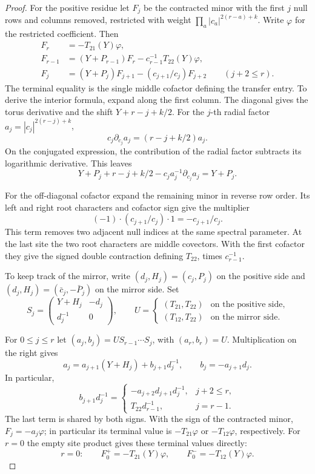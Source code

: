 \begin{proof}
For the positive residue let \(F_j\) be the contracted
minor with the first \(j\) null rows and columns removed,
restricted with weight \(\prod_a|c_a|^{2(r-a)+k}\).
Write \(\varphi\) for the restricted coefficient.
Then
\begin{align*}
 F_r&=-T_{21}(Y)\varphi,\\
 F_{r-1}&=(Y+P_{r-1})F_r-c_{r-1}^{-1}T_{22}(Y)\varphi,\\
 F_j&=(Y+P_j)F_{j+1}-(c_{j+1}/c_j)F_{j+2}
                       \qquad (j+2\le r).
\end{align*}
The terminal equality is the single middle cofactor
defining the transfer entry. To derive the interior
formula, expand along the first column. The diagonal gives the torus derivative and the shift
\(Y+r-j+k/2\). For the \(j\)-th radial factor \(a_j=|c_j|^{2(r-j)+k}\),
\[
                     c_j\partial_{c_j}a_j
                        =(r-j+k/2)a_j .
\]
On the conjugated expression, the contribution of the
radial factor subtracts its logarithmic derivative. This leaves
\[
 Y+P_j+r-j+k/2-c_j a_j^{-1}\partial_{c_j}a_j=Y+P_j .
\]

For the off-diagonal cofactor expand the remaining
minor in reverse row order. Its left and right root characters
and cofactor sign give the multiplier
\[
      (-1)\cdot(c_{j+1}/c_j)\cdot 1=-c_{j+1}/c_j .
\]
This term removes two adjacent null indices at the same spectral parameter. At the last site the
two root characters are middle covectors. With the
first cofactor they give the signed double contraction
defining \(T_{22}\), times \(c_{r-1}^{-1}\).

To keep track of the mirror, write \((d_j,H_j)=(c_j,P_j)\)
on the positive side and \((d_j,H_j)=(\bar c_j,-\bar P_j)\)
on the mirror side. Set
\[
 S_j=\begin{pmatrix}Y+H_j&-d_j\\d_j^{-1}&0\end{pmatrix},
 \qquad
 U=\begin{cases}(T_{21},T_{22})&\text{on the positive side},\\
                 (T_{12},T_{22})&\text{on the mirror side}.
   \end{cases}
\]

For \(0\le j\le r\) let \((a_j,b_j)=U S_{r-1}\cdots S_j\),
with \((a_r,b_r)=U\). Multiplication on the right gives
\[
 a_j=a_{j+1}(Y+H_j)+b_{j+1}d_j^{-1},\qquad
 b_j=-a_{j+1}d_j .
\]
In particular,
\[
 b_{j+1}d_j^{-1}=
 \begin{cases}
  -a_{j+2}d_{j+1}d_j^{-1},&j+2\le r,\\
  T_{22}d_{r-1}^{-1},&j=r-1 .
 \end{cases}
\]
The last term is shared by both signs. With the sign of
the contracted minor, \(F_j=-a_j\varphi\); in particular its
terminal value is \(-T_{21}\varphi\) or \(-T_{12}\varphi\),
respectively. For \(r=0\) the empty site product gives these
terminal values directly:
\[
    r=0:\qquad F_0^+=-T_{21}(Y)\varphi,\qquad
                    F_0^-=-T_{12}(Y)\varphi .
\]


\end{proof}
